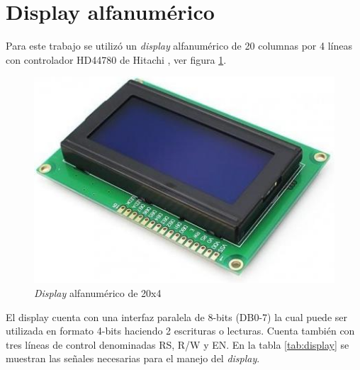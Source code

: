 \section{Display alfanumérico}

Para este trabajo se utilizó un \textit{display} alfanumérico de 20 columnas por 4 líneas con controlador HD44780 de Hitachi \citep{HD44780}, ver figura \ref{fig:display}.

\begin{figure}[htpb]
	\centering
	\includegraphics[scale=0.7]{./Figures/display.jpg}
	\caption{\textit{Display} alfanumérico de 20x4}
	\label{fig:display}
\end{figure}

El display cuenta con una interfaz paralela de 8-bits (DB0-7) la cual puede ser utilizada en formato 4-bits haciendo 2 escrituras o lecturas. Cuenta también con tres líneas de control denominadas RS, R/W y EN. En la tabla \ref{tab:display} se muestran las señales necesarias para el manejo del \textit{display}.

